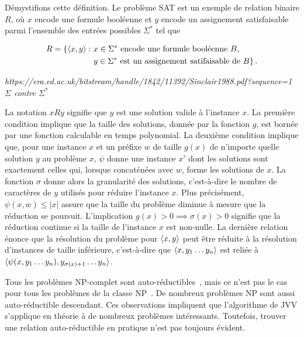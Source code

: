 Démystifions cette définition. Le problème SAT est un exemple de relation binaire $R$, où $x$ encode une formule booléenne et $y$ encode un assignement satisfaisable parmi l'ensemble des entrées possibles $\Sigma^{*}$ tel que

\begin{equation}
    \begin{aligned}
    R = \{ \braket{x, y} : \ & x \in \Sigma^{*} \text{ encode une formule booléenne } B, \\ 
    & y \in \Sigma^{*} \text{ est un assignement satifaisable de } B \} \,.
    \end{aligned}
\end{equation}

\textcolor{mydarkred}{\textit{https://era.ed.ac.uk/bitstream/handle/1842/11392/Sinclair1988.pdf?sequence=1}}
\textcolor{mydarkred}{\textit{$\Sigma$ contre $\Sigma^{*}$}}

La notation $xRy$ signifie que $y$ est une solution valide à l'instance $x$. La première condition implique que la taille des solutions, donnée par la fonction $g$, est bornée par une fonction calculable en temps polynomial. La deuxième condition implique que, pour une instance $x$ et un préfixe $w$ de taille $g(x)$ de n'importe quelle solution $y$ au problème $x$, $\psi$ donne une instance $x'$ dont les solutions sont exactement celles qui, lorsque concaténées avec $w$, forme les solutions de $x$. La fonction $\sigma$ donne alors la granularité des solutions, c'est-à-dire le nombre de caractères de $y$ utilisés pour réduire l'instance $x$. Plus précisément, $\psi(x, w) \leq \lvert x \rvert$ assure que la taille du problème diminue à mesure que la réduction se poursuit. L'implication $g(x) > 0 \implies  \sigma(x) > 0$ signifie que la réduction continue si la taille de l'instance $x$ est non-nulle. La dernière relation énonce que la résolution du problème pour $\braket{x, y}$ peut être réduite à la résolution d'instances de taille inférieure, c'est-à-dire que $\braket{x, y_{1}\dots y_{n}}$ est reliée à $\braket{\psi(x, y_{1}\dots y_{n}), y_{\sigma(x)+1}\dots y_{n}}$.

Tous les problèmes \textsf{NP}-complet sont auto-réductibles~\cite{goldreichComputationalComplexityConceptual2008}, mais ce n'est pas le cas pour tous les problèmes de la classe \textsf{NP}~\cite{khullerPlanarGraphColoring1991a}. De nombreux problèmes \textsf{NP} sont aussi auto-réductible descendant. Ces observations impliquent que l'algorithme de JVV s'applique en théorie à de nombreux problèmes intéressants. Toutefois, trouver une relation auto-réductible en pratique n'est pas toujours évident.


